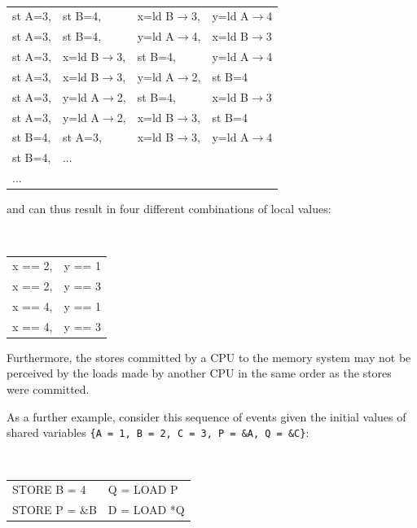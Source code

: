 \vspace{5pt}
\begin{minipage}[t]{\columnwidth}
\tt
\scriptsize
\begin{tabular}{llll}
	st A=3, & st B=4, & x=ld B$\rightarrow$3, & y=ld A$\rightarrow$4 \\
	st A=3, & st B=4, & y=ld A$\rightarrow$4, & x=ld B$\rightarrow$3 \\
	st A=3, & x=ld B$\rightarrow$3, & st B=4, & y=ld A$\rightarrow$4 \\
	st A=3, & x=ld B$\rightarrow$3, & y=ld A$\rightarrow$2, & st B=4 \\
	st A=3, & y=ld A$\rightarrow$2, & st B=4, & x=ld B$\rightarrow$3 \\
	st A=3, & y=ld A$\rightarrow$2, & x=ld B$\rightarrow$3, & st B=4 \\
	st B=4, & st A=3, & x=ld B$\rightarrow$3, & y=ld A$\rightarrow$4 \\
	st B=4, & ... & & \\
	... & & & \\
\end{tabular}
\vspace{3pt}
\end{minipage}
%
and can thus result in four different combinations of local values:

\vspace{5pt}
\begin{minipage}[t]{\columnwidth}
\tt
\scriptsize
\begin{tabular}{ll}
	x == 2, & y == 1 \\
	x == 2, & y == 3 \\
	x == 4, & y == 1 \\
	x == 4, & y == 3 \\
\end{tabular}
\end{minipage}
\vspace{5pt}

Furthermore, the stores committed by a CPU to the memory system may not be
perceived by the loads made by another CPU in the same order as the stores were
committed.

As a further example, consider this sequence of events given the
initial values of shared variables
{\tt \{A~=~1, B~=~2, C~=~3, P~=~\&A, Q~=~\&C\}}:

\vspace{5pt}
\begin{minipage}[t]{\columnwidth}
\tt
\scriptsize
\begin{tabular}{l|l}
	\nf{CPU 1}	& \nf{CPU 2} \\
	\hline
	STORE B = 4	& Q = LOAD P \\
	STORE P = \&B	& D = LOAD *Q \\
\end{tabular}
\end{minipage}
\vspace{5pt}

